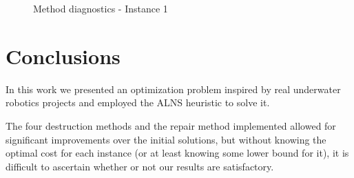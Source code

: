 \documentclass[conference]{IEEEtran}
\begin{document}
\begin{figure}[h!]
  	  \centering
  	  
      \caption{Method diagnostics - Instance 1}
      \label{fig:inst1_methods}
\end{figure}

\pagebreak

\begin{table}[h!]
\caption{Optimization Results}
\label{tab:optimization_results}
\centering
{}
\end{table}



\section{Conclusions}

In this work we presented an optimization problem inspired by real underwater robotics projects and employed the ALNS heuristic to solve it. 

The four destruction methods and the repair method implemented allowed for significant improvements over the initial solutions, but without knowing the optimal cost for each instance (or at least knowing some lower bound for it), it is difficult to ascertain whether or not our results are satisfactory.
\end{document}
